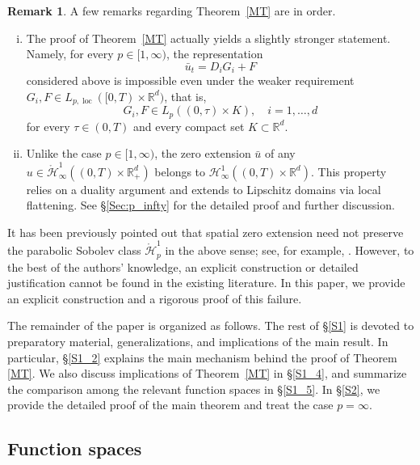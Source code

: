 \documentclass[reqno]{amsart}
\numberwithin{equation}{section}
\theoremstyle{plain}
\theoremstyle{definition}
\newtheorem{remark}[theorem]{Remark}
\def\bR{\mathbb{R}}
\def\cH{\mathcal{H}}
\begin{document}
\begin{remark}
A few remarks regarding Theorem~\ref{MT} are in order.
\begin{enumerate}[(i)]
    \item The proof of Theorem~\ref{MT} actually yields a slightly stronger statement.
Namely, for every $p\in[1,\infty)$, the representation
\[
\bar u_t = D_iG_i+F
\]
considered above is impossible even under the weaker requirement $G_i,F\in L_{p,\operatorname{loc}}([0,T)\times \bR^d)$, that is,
\[
G_i,F\in L_p((0,\tau)\times K), \quad i=1,\ldots,d
\]
for every $\tau \in (0,T)$ and every compact set $K \subset \bR^d$.

\item 
Unlike the case $p \in [1, \infty)$, the zero extension $\bar{u}$ of any $u \in \mathring{\cH}^1_\infty((0,T) \times \bR^d_+)$ belongs to $\cH^1_\infty((0,T) \times \bR^d)$.
This property relies on a duality argument and extends to Lipschitz domains via local flattening.
See \S \ref{Sec:p_infty} for the detailed proof and further discussion.

\end{enumerate}
\end{remark}


It has been previously pointed out that spatial zero extension need not preserve the parabolic Sobolev class $\mathring{\cH}^1_p$ in the above sense; see, for example, \cite{MR4387945}.
However, to the best of the authors' knowledge, an explicit construction or detailed justification cannot be found in the existing literature.
In this paper, we provide an explicit construction and a rigorous proof of this failure.

\bigskip


The remainder of the paper is organized as follows.
The rest of \S\ref{S1} is devoted to preparatory material, generalizations, and implications of the main result.
In particular, \S\ref{S1_2} explains the main mechanism behind the proof of Theorem \ref{MT}.
We also discuss implications of Theorem~\ref{MT} in \S\ref{S1_4}, and summarize the comparison among the relevant function spaces in \S\ref{S1_5}.
In \S\ref{S2}, we provide the detailed proof of the main theorem and treat the case $p=\infty$.


\subsection{Function spaces}		\label{S1_1}
\end{document}
